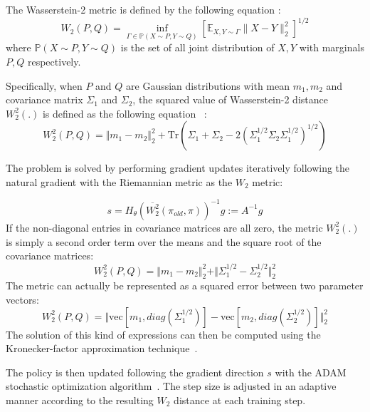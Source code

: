 The Wasserstein-2 metric is defined by the following equation \cite{villani2003topics}:
\begin{equation}
    W_2(P,Q) = 
    \inf_{\Gamma \in \mathbb{P}(X \sim P, Y \sim Q)}
   \left[  \mathbb{E}_{X,Y \sim \Gamma} \lVert X-Y \rVert_2^2 \right]^{1/2}
\end{equation}
where $\mathbb{P}(X \sim P, Y \sim Q)$ is the set of all joint distribution of $X,Y$ with marginals $P,Q$ respectively.

Specifically, when $P$ and $Q$ are Gaussian distributions with mean $m_1,m_2$ and covariance matrix $\Sigma_1$ and $\Sigma_2$, the squared value of Wasserstein-2 distance $W_2^2(.)$ is defined as the following equation~\cite{chafai} :
\begin{equation}
    W_2^2(P,Q) = \Vert m_1-m_2\Vert_2^2 +\mathrm{Tr}\left(\Sigma_1+\Sigma_2-2(\Sigma_1^{1/2}\Sigma_2\Sigma_1^{1/2})^{1/2}\right)
\end{equation}

The problem is solved by performing gradient updates iteratively following the natural gradient with the Riemannian metric as the $W_2$ metric:

\begin{equation}
    s=H_\theta\left( \overline{W_2^2}(\pi_{old},\pi) \right)^{-1}g := A^{-1}g
\end{equation}
%
%
If the non-diagonal entries in covariance matrices are all zero, the metric $W_2^2(.)$ is simply a second order term over the means and the square root of the covariance matrices:
\begin{equation}
W_2^2(P,Q) = \Vert m_1-m_2\Vert_2^2 +\Vert \Sigma_1^{1/2}-\Sigma_2^{1/2}\Vert_2^2
\end{equation}
The metric can actually be represented as a squared error between two parameter vectors:
\begin{equation}
W_2^2(P,Q) = \Vert \text{vec}[m_1,diag(\Sigma_1^{1/2})]-\text{vec}[m_2,diag(\Sigma_2^{1/2})]\Vert_2^2 
\end{equation}
The solution of this kind of expressions can then be computed using the Kronecker-factor approximation technique~\cite{wu2017scalable}.

The policy is then updated following the gradient direction $s$ with the ADAM stochastic optimization algorithm~\cite{kingma2014adam}. The step size is adjusted in an adaptive manner according to the resulting $W_2$ distance at each training step.
